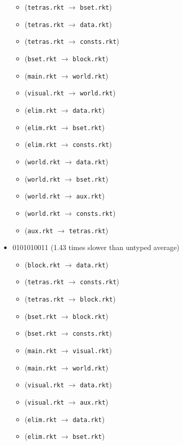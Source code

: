 \documentclass{article}
\newcommand{\mono}[1]{\texttt{#1}}
\begin{document}
\begin{itemize}
\begin{itemize}
  \item (\mono{tetras.rkt} $\rightarrow$ \mono{bset.rkt})
  \item (\mono{tetras.rkt} $\rightarrow$ \mono{data.rkt})
  \item (\mono{tetras.rkt} $\rightarrow$ \mono{consts.rkt})
  \item (\mono{bset.rkt} $\rightarrow$ \mono{block.rkt})
  \item (\mono{main.rkt} $\rightarrow$ \mono{world.rkt})
  \item (\mono{visual.rkt} $\rightarrow$ \mono{world.rkt})
  \item (\mono{elim.rkt} $\rightarrow$ \mono{data.rkt})
  \item (\mono{elim.rkt} $\rightarrow$ \mono{bset.rkt})
  \item (\mono{elim.rkt} $\rightarrow$ \mono{consts.rkt})
  \item (\mono{world.rkt} $\rightarrow$ \mono{data.rkt})
  \item (\mono{world.rkt} $\rightarrow$ \mono{bset.rkt})
  \item (\mono{world.rkt} $\rightarrow$ \mono{aux.rkt})
  \item (\mono{world.rkt} $\rightarrow$ \mono{consts.rkt})
  \item (\mono{aux.rkt} $\rightarrow$ \mono{tetras.rkt})
  \end{itemize}
\item 0101010011 (1.43 times slower than untyped average)
  \begin{itemize}
  \item (\mono{block.rkt} $\rightarrow$ \mono{data.rkt})
  \item (\mono{tetras.rkt} $\rightarrow$ \mono{consts.rkt})
  \item (\mono{tetras.rkt} $\rightarrow$ \mono{block.rkt})
  \item (\mono{bset.rkt} $\rightarrow$ \mono{block.rkt})
  \item (\mono{bset.rkt} $\rightarrow$ \mono{consts.rkt})
  \item (\mono{main.rkt} $\rightarrow$ \mono{visual.rkt})
  \item (\mono{main.rkt} $\rightarrow$ \mono{world.rkt})
  \item (\mono{visual.rkt} $\rightarrow$ \mono{data.rkt})
  \item (\mono{visual.rkt} $\rightarrow$ \mono{aux.rkt})
  \item (\mono{elim.rkt} $\rightarrow$ \mono{data.rkt})
  \item (\mono{elim.rkt} $\rightarrow$ \mono{bset.rkt})

\end{itemize}
\end{itemize}
\end{document}
